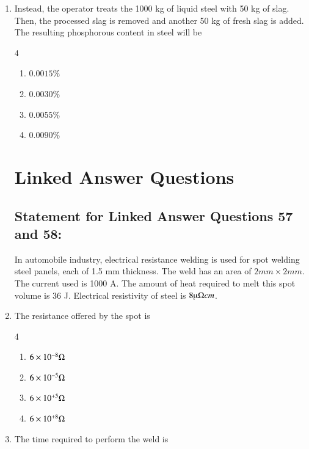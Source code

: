 \documentclass[journal]{IEEEtran}
\theoremstyle{remark}
\begin{document}
\begin{enumerate}
\begin {multicols}{4}
\begin{enumerate}
\item   $0.001 \%$
\item    $0.002\%$
\item  $0.010\%$
\item $0.018\%$
\end{enumerate}
\end{multicols}
\item    Instead, the operator treats the 1000 kg of liquid steel with 50 kg of slag. Then, the processed slag is removed and another 50 kg of fresh slag is added. The resulting phosphorous content in steel will be

\hfill{}

\begin {multicols}{4}
\begin{enumerate}
\item   $0.0015\%$
\item   $0.0030\%$
\item   $0.0055\%$
\item $0.0090\%$
\end{enumerate}
\end{multicols}
\section*{Linked Answer Questions}
\subsection*{Statement for Linked Answer Questions 57 and 58:}
In automobile industry, electrical resistance welding is used for spot welding steel panels, each of 1.5 mm thickness. The weld has an area of $2 mm \times 2 mm$. The current used is 1000 A. The amount of heat required to melt this spot volume is 36 J. Electrical resistivity of steel is $8 \micro \ohm cm$.
\item   The resistance offered by the spot is
\hfill{}

\begin {multicols}{4}
\begin{enumerate}
\item  $6 \times10^{-8} \ohm$
\item   $6 \times10^{-5} \ohm$
\item  $6 \times10^{+5} \ohm$
\item$6 \times10^{+8} \ohm$
\end{enumerate}
\end{multicols}
\item   The time required to perform the weld is
\hfill{}


\end{enumerate}
\end{document}
